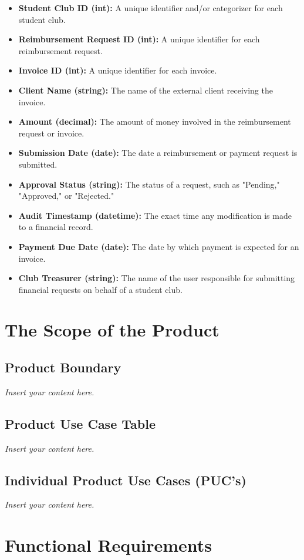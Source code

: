 \documentclass[12pt]{article}
\newcommand{\lips}{\textit{Insert your content here.}}
\begin{document}
\begin{itemize}
    \item \textbf{Student Club ID (int):} A unique identifier and/or categorizer for each student club.
    \item \textbf{Reimbursement Request ID (int):} A unique identifier for each reimbursement request.
    \item \textbf{Invoice ID (int):} A unique identifier for each invoice. 
    \item \textbf{Client Name (string):} The name of the external client receiving the invoice.
    \item \textbf{Amount (decimal):} The amount of money involved in the reimbursement request or invoice.
    \item \textbf{Submission Date (date):} The date a reimbursement or payment request is submitted.
    \item \textbf{Approval Status (string):} The status of a request, such as "Pending," "Approved," or "Rejected."
    \item \textbf{Audit Timestamp (datetime):} The exact time any modification is made to a financial record.
    \item \textbf{Payment Due Date (date):} The date by which payment is expected for an invoice.
    \item \textbf{Club Treasurer (string):} The name of the user responsible for submitting financial requests on behalf of a student club.
\end{itemize}

\section{The Scope of the Product}
\subsection{Product Boundary}
\lips
\subsection{Product Use Case Table}
\lips
\subsection{Individual Product Use Cases (PUC's)}
\lips

\section{Functional Requirements}
\end{document}
